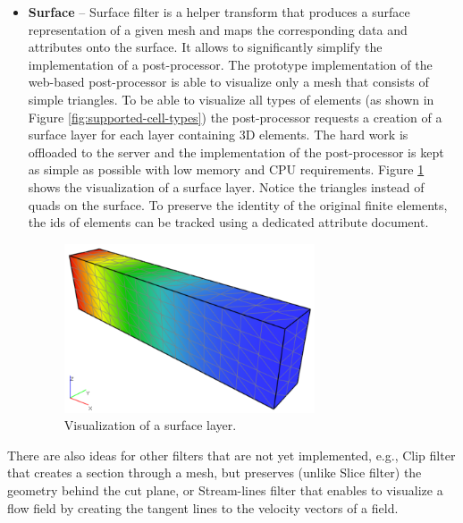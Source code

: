\begin{itemize}
    \item \textbf{Surface} -- Surface filter is a helper transform that produces a surface representation of a given mesh and maps the corresponding data and attributes onto the surface. It allows to significantly simplify the implementation of a post-processor. The prototype implementation of the web-based post-processor is able to visualize only a mesh that consists of simple triangles. To be able to visualize all types of elements (as shown in Figure \ref{fig:supported-cell-types}) the post-processor requests a creation of a surface layer for each layer containing 3D elements. The hard work is offloaded to the server and the implementation of the post-processor is kept as simple as possible with low memory and CPU requirements. Figure \ref{fig:beam-surface-layer} shows the visualization of a surface layer. Notice the triangles instead of quads on the surface. To preserve the identity of the original finite elements, the ids of elements can be tracked using a dedicated attribute document.

    \begin{figure}[H]
        \centering
        \includegraphics[width=0.7\textwidth]{figures/chapter-data-management/beam-surface-layer}
        \decoRule
        \caption{Visualization of a surface layer.}
        \label{fig:beam-surface-layer}
    \end{figure}

\end{itemize}

There are also ideas for other filters that are not yet implemented, e.g., Clip filter that creates a section through a mesh, but preserves (unlike Slice filter) the geometry behind the cut plane, or Stream-lines filter that enables to visualize a flow field by creating the tangent lines to the velocity vectors of a field.

